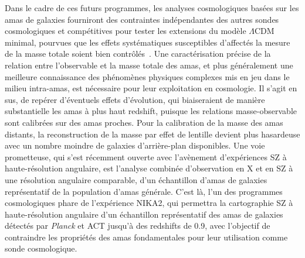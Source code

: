 Dans le cadre de ces futurs programmes, les analyses cosmologiques
basées sur les amas de galaxies fourniront des contraintes
indépendantes des autres sondes cosmologiques et compétitives pour
tester les extensions du modèle $\Lambda$CDM minimal, pourvues que les
effets systématiques susceptibles d'affectés la mesure de la masse
totale soient bien contrôlés~\citep{Mana2013, Krause2017,
Sartoris2016, SO2019, eROSITA_cosmo}.
Une caractérisation précise de la relation entre l’observable et la
masse totale des amas, et plus généralement une meilleure
connaissance des phénomènes physiques complexes mis en jeu dans le
milieu intra-amas, est nécessaire pour leur exploitation en cosmologie. 
Il s'agit en sus, de repérer d’éventuels effets d’évolution, qui
biaiseraient de manière substantielle les amas à plus haut redshift,
puisque les relations masse-observable sont calibrées sur des amas
proches. Pour la calibration de la masse des amas distants, la
reconstruction de la masse par effet de lentille devient plus
hasardeuse avec un nombre moindre de galaxies d'arrière-plan
disponibles. Une voie prometteuse, qui s'est récemment ouverte avec
l'avènement d'expériences SZ à haute-résolution angulaire, est
l'analyse combinée d'observation en X et en SZ à une résolution
angulaire comparable, d'un échantillon d'amas de galaxies
représentatif de la population d'amas générale.
C'est là, l'un des programmes cosmologiques phare de l’expérience
NIKA2, qui permettra la cartographie SZ à haute-résolution angulaire
d’un échantillon représentatif des amas de galaxies détectés
par \emph{Planck} et ACT jusqu'à des redshifts de 0.9, avec l'objectif
de contraindre les propriétés des amas fondamentales pour leur
utilisation comme sonde cosmologique.\\


